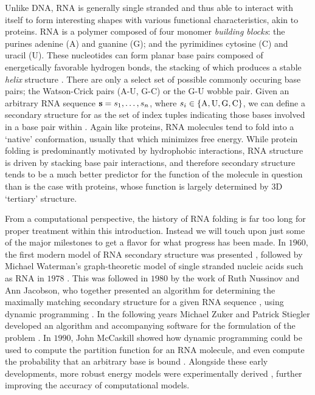 Unlike DNA, RNA is generally single stranded and thus able to interact with itself
to form interesting shapes with various functional characteristics, akin to
proteins. RNA is a polymer composed of four monomer {\em building blocks}:
the purines
adenine (A) and guanine (G); and the pyrimidines cytosine (C) and uracil (U). These
nucleotides can form planar base pairs composed of energetically favorable
hydrogen bonds, the stacking of which produces a stable {\em helix} structure
\citep{yakovchuk:2006bm}. There are only a select set of possible
commonly occuring base pairs; the
Watson-Crick pairs (A-U, G-C) or the G-U wobble pair. Given an arbitrary RNA
sequence ${\bf s} = s_1,\dots,s_n$, where $s_i \in \{\text{A,\,U,\,G,\,C}\}$, we can define
a secondary structure \str for \seq as the set of index tuples indicating those
bases involved in a base pair within \seq. Again like proteins, RNA molecules tend
to fold into a `native' conformation, usually that which minimizes free energy.
While protein folding is predominantly motivated by hydrophobic
interactions, RNA structure is driven by stacking base pair interactions, and
therefore secondary structure tends to be a much better predictor for the function
of the molecule in question than is the case with proteins, whose function is
largely determined by 3D `tertiary' structure.

From a computational perspective, the history of RNA folding is far too long for
proper treatment within this introduction. Instead we will touch upon just some
of the major milestones to get a flavor for what progress has been made.
In $1960$, the first modern model of RNA secondary structure was presented
\citep{fresco:1960vg}, followed by
Michael Waterman's graph-theoretic model of single stranded
nucleic acids such as RNA in $1978$ \citep{waterman:1978va}. This was followed in $1980$ by
the work of Ruth Nussinov and Ann Jacobson, who together presented an algorithm for
determining the maximally matching secondary structure \str for
a given RNA sequence \citep{nussinov:1978wc}, using dynamic programming
\citep{bellman:1952vza}. In the following years Michael Zuker and Patrick Stiegler
developed an algorithm and accompanying software for the \mfe
formulation of the problem \citep{zuker:1981tf,zuker:1989im}. In $1990$, John
McCaskill showed how dynamic programming could be used to compute the
partition function for an RNA molecule, and even compute the probability that an
arbitrary base is bound \citep{mccaskill}. Alongside these early developments,
more robust energy models were experimentally derived \citep{turner,turner:2009vy},
further improving the accuracy of computational models.

